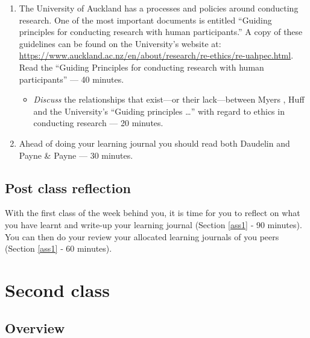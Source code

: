 \documentclass[]{book}
\providecommand{\tightlist}{%
  \setlength{\itemsep}{0pt}\setlength{\parskip}{0pt}}
\theoremstyle{definition}
\theoremstyle{definition}
\theoremstyle{definition}
\theoremstyle{remark}
\begin{document}
\begin{enumerate}
\def\labelenumi{\arabic{enumi}.}
\setcounter{enumi}{3}
\item
  The University of Auckland has a processes and policies around
  conducting research. One of the most important documents is entitled
  ``Guiding principles for conducting research with human
  participants.'' A copy of these guidelines can be found on the
  University's website at:
  \url{https://www.auckland.ac.nz/en/about/research/re-ethics/re-uahpec.html}.
  Read the ``Guiding Principles for conducting research with human
  participants''
  \autocite{theuniversityofauckland_2013_guidingprinciplesconducting}
  --- 40 minutes.

  \begin{itemize}
  \tightlist
  \item
    \emph{Discuss} the relationships that exist---or their
    lack---between Myers
    \autocite*{myers_2013_qualitativeresearchbusiness}, Huff
    \autocite*{huff_2009_designingresearchpublication} and the
    University's ``Guiding principles \ldots{}'' with regard to ethics
    in conducting research --- 20 minutes.
  \end{itemize}
\item
  Ahead of doing your learning journal you should read both Daudelin
  \autocite*{daudelin_1996_learningexperiencereflection} and Payne \&
  Payne \autocite*{payne_2004_reflexivity} --- 30 minutes.
\end{enumerate}

\hypertarget{post-class-reflection}{%
\subsection{Post class reflection}\label{post-class-reflection}}

With the first class of the week behind you, it is time for you to
reflect on what you have learnt and write-up your learning journal
(Section \ref{ass1} ‐ 90 minutes). You can then do your review your
allocated learning journals of you peers (Section \ref{ass1} ‐ 60
minutes).

\hypertarget{second-class}{%
\section*{Second class}\label{second-class}}

\hypertarget{overview-1}{%
\subsection*{Overview}\label{overview-1}}
\end{document}
